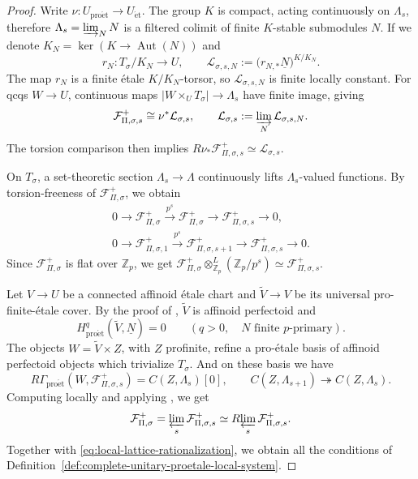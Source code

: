 \documentclass[11pt]{article}
\theoremstyle{definition}
\newcommand{\Zp}{\mathbb Z_p}
\newcommand{\cF}{\mathcal F}
\newcommand{\proet}{\mathrm{pro\acute et}}
\newcommand{\et}{\mathrm{\acute et}}
\begin{document}
\begin{proof}
Write \(\nu:U_{\proet}\to U_{\et}\).
The group \(K\) is compact, acting continuously on \(\Lambda_s\), therefore
\(\Lambda_s=\varinjlim_NN\) is a filtered colimit of finite \(K\)-stable submodules $N$.
If we denote \(K_N=\ker(K\to\operatorname{Aut}(N))\) and 
\[
 r_N:T_\sigma/K_N\longrightarrow U,\qquad
 \mathcal L_{\sigma,s,N}
 :=\bigl(r_{N,*}\underline N\bigr)^{K/K_N}.
\]
The map \(r_N\) is a finite \'etale \(K/K_N\)-torsor, so
\(\mathcal L_{\sigma,s,N}\) is finite locally constant.
For qcqs \(W\to U\), continuous maps
\(\lvert W\times_UT_\sigma\rvert\to\Lambda_s\) have finite image, giving
\begin{equation}\label{eq:general-unitary-ind-finite}
 \cF_{\Pi,\sigma,s}^+\cong\nu^*\mathcal L_{\sigma,s},\qquad
 \mathcal L_{\sigma,s}:=\varinjlim_N\mathcal L_{\sigma,s,N}.
\end{equation}
The torsion comparison \cite[Corollary~3.17]{ScholzeRigid} then implies
\(R\nu_*\cF_{\Pi,\sigma,s}^+\simeq\mathcal L_{\sigma,s}\).

On \(T_\sigma\), a set-theoretic section
\(\Lambda_s\to\Lambda\) continuously lifts
\(\Lambda_s\)-valued functions. By torsion-freeness of $\cF_{\Pi,\sigma}^+$, we obtain
\begin{gather}
 0\longrightarrow\cF_{\Pi,\sigma}^+
 \xrightarrow{p^s}\cF_{\Pi,\sigma}^+
 \longrightarrow\cF_{\Pi,\sigma,s}^+\longrightarrow0,
 \label{eq:RH-local-sheaf-reduction}\\
 0\longrightarrow\cF_{\Pi,\sigma,1}^+
 \xrightarrow{p^s}\cF_{\Pi,\sigma,s+1}^+
 \longrightarrow\cF_{\Pi,\sigma,s}^+\longrightarrow0.
 \label{eq:RH-local-successive-reduction}
\end{gather}
Since $\cF_{\Pi, \sigma}^+$ is flat over $\Zp$, we get \( \cF_{\Pi,\sigma}^+\otimes_{\Zp}^L(\Zp/p^s) \simeq\cF_{\Pi,\sigma,s}^+.\)

Let \(V\to U\) be a connected affinoid \'etale chart and
\(\widetilde V\to V\) be its universal pro-finite-\'etale cover.
By the proof of \cite[Theorem~4.9]{ScholzeRigid},
\(\widetilde V\) is affinoid perfectoid and
\[
 H^q_{\proet}(\widetilde V,\underline N)=0
 \qquad(q>0,\quad N\text{ finite }p\text{-primary}).
\]
The objects \(W=\widetilde V\times Z\), with \(Z\) profinite,
refine a pro-\'etale basis of affinoid perfectoid objects which trivialize \(T_\sigma\).
And on these basis we have 
\[
 R\Gamma_{\proet}(W,\cF_{\Pi,\sigma,s}^+)=C(Z,\Lambda_s)[0],\qquad
 C(Z,\Lambda_{s+1})\twoheadrightarrow C(Z,\Lambda_s).
\]
Computing locally and applying \cite[Lemma~3.18]{ScholzeRigid}, we get
\begin{equation}\label{eq:general-unitary-completion}
 \cF_{\Pi,\sigma}^+
 =\varprojlim_s\cF_{\Pi,\sigma,s}^+
 \simeq R\!\varprojlim_s\cF_{\Pi,\sigma,s}^+.
\end{equation}
Together with \eqref{eq:local-lattice-rationalization}, we obtain
all the conditions of Definition~\ref{def:complete-unitary-proetale-local-system}.
\end{proof}
\end{document}
